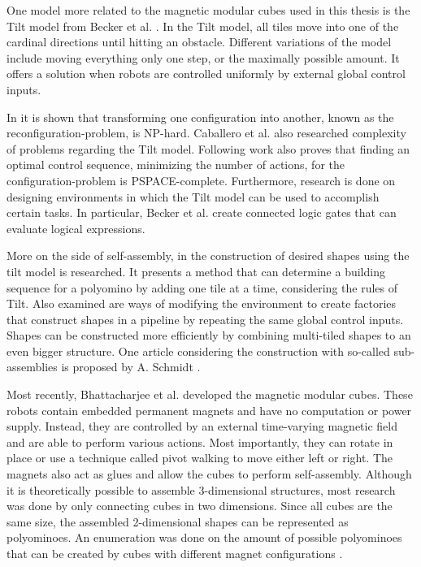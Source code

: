 One model more related to the magnetic modular cubes used in this thesis is the Tilt model from Becker et al. \cite{Becker2014_SP}.
In the Tilt model, all tiles move into one of the cardinal directions until hitting an obstacle.
Different variations of the model include moving everything only one step, or the maximally possible amount.
It offers a solution when robots are controlled uniformly by external global control inputs.

In \cite{Becker2014_SP} it is shown that transforming one configuration into another, known as the reconfiguration-problem, is NP-hard.
Caballero et al. \cite{caballero2020} also researched complexity of problems regarding the Tilt model.
Following work \cite{Becker2014} also proves that finding an optimal control sequence, minimizing the number of actions, for the configuration-problem is PSPACE-complete.
Furthermore, research is done on designing environments in which the Tilt model can be used to accomplish certain tasks.
In particular, Becker et al. \cite{Becker2014} create connected logic gates that can evaluate logical expressions.

More on the side of self-assembly, in \cite{Becker2020} the construction of desired shapes using the tilt model is researched.
It presents a method that can determine a building sequence for a polyomino by adding one tile at a time, considering the rules of Tilt.
Also examined are ways of modifying the environment to create factories that construct shapes in a pipeline by repeating the same global control inputs.
Shapes can be constructed more efficiently by combining multi-tiled shapes to an even bigger structure.
One article considering the construction with so-called sub-assemblies is proposed by A. Schmidt \cite{Schmidt2018}.

Most recently, Bhattacharjee et al. \cite{Bhattacharjee2022} developed the magnetic modular cubes.
These robots contain embedded permanent magnets and have no computation or power supply.
Instead, they are controlled by an external time-varying magnetic field and are able to perform various actions.
Most importantly, they can rotate in place or use a technique called pivot walking to move either left or right.
The magnets also act as glues and allow the cubes to perform self-assembly.
Although it is theoretically possible to assemble 3-dimensional structures, most research was done by only connecting cubes in two dimensions.
Since all cubes are the same size, the assembled 2-dimensional shapes can be represented as polyominoes.
An enumeration was done on the amount of possible polyominoes that can be created by cubes with different magnet configurations \cite{Lu2021}.

